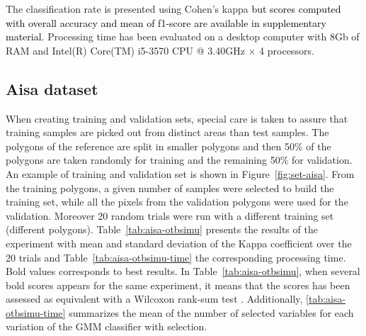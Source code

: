 \documentclass[journal,10pt]{IEEEtran}
\newcommand{\rev}[1]{\textcolor{black}{#1}}
\begin{document}
    The    classification   rate    is    presented   using    Cohen's
    kappa \rev{but scores computed with overall accuracy and mean of f1-score are available in supplementary material}. Processing  time has been  evaluated on a  desktop computer
    with  8Gb of  RAM  and  Intel(R) Core(TM)  i5-3570  CPU @  3.40GHz
    $\times$ 4 processors.

    \subsection{Aisa dataset}
    \label{sec:aisa}

    When creating training and validation  sets, special care is taken
    to assure that training samples are picked out from distinct areas
    than test  samples.  The  polygons of the  reference are  split in
    smaller polygons and then 50\%  of the polygons are taken randomly
    for training and the remaining 50\% for validation.  An example of
    training      and     validation      set     is      shown     in
    Figure~\ref{fig:set-aisa}.  From the  training  polygons, a  given
    number of samples  were selected to build the  training set, while
    all  the pixels  from the  validation polygons  were used  for the
    validation.  Moreover 20  random trials were run  with a different
    training  set (different  polygons).  Table~\ref{tab:aisa-otbsimu}
    presents  the results  of the  experiment with  mean and  standard
    deviation  of  the  Kappa  coefficient  over  the  20  trials  and
    Table~\ref{tab:aisa-otbsimu-time}  the   corresponding  processing
    time. Bold values corresponds to best results. In Table~\ref{tab:aisa-otbsimu}, when several bold scores appears for the same experiment, it means that the scores has been assessed as equivalent with a Wilcoxon rank-sum test \cite{mann1947test}. Additionally, \ref{tab:aisa-otbsimu-time} summarizes the mean of the number of selected variables for each variation of the GMM classifier with selection.
\end{document}
